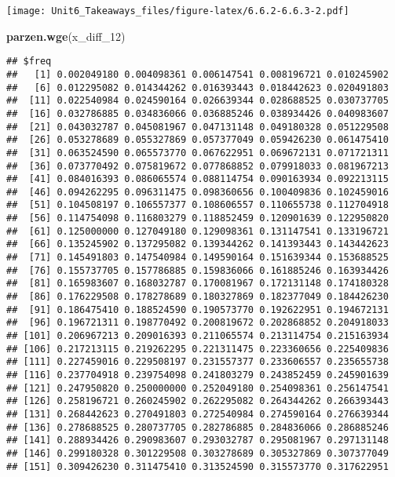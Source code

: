 \documentclass[]{article}
\newenvironment{Shaded}{\begin{snugshade}}{\end{snugshade}}
\newcommand{\DecValTok}[1]{\textcolor[rgb]{0.00,0.00,0.81}{#1}}
\newcommand{\KeywordTok}[1]{\textcolor[rgb]{0.13,0.29,0.53}{\textbf{#1}}}
\newcommand{\NormalTok}[1]{#1}
\begin{document}
\texttt{[image: Unit6\_Takeaways\_files/figure-latex/6.6.2-6.6.3-2.pdf]}

\begin{Shaded}
\begin{Highlighting}[]
\KeywordTok{parzen.wge}\NormalTok{(x_diff_}\DecValTok{12}\NormalTok{)}
\end{Highlighting}
\end{Shaded}

\begin{verbatim}
## $freq
##   [1] 0.002049180 0.004098361 0.006147541 0.008196721 0.010245902
##   [6] 0.012295082 0.014344262 0.016393443 0.018442623 0.020491803
##  [11] 0.022540984 0.024590164 0.026639344 0.028688525 0.030737705
##  [16] 0.032786885 0.034836066 0.036885246 0.038934426 0.040983607
##  [21] 0.043032787 0.045081967 0.047131148 0.049180328 0.051229508
##  [26] 0.053278689 0.055327869 0.057377049 0.059426230 0.061475410
##  [31] 0.063524590 0.065573770 0.067622951 0.069672131 0.071721311
##  [36] 0.073770492 0.075819672 0.077868852 0.079918033 0.081967213
##  [41] 0.084016393 0.086065574 0.088114754 0.090163934 0.092213115
##  [46] 0.094262295 0.096311475 0.098360656 0.100409836 0.102459016
##  [51] 0.104508197 0.106557377 0.108606557 0.110655738 0.112704918
##  [56] 0.114754098 0.116803279 0.118852459 0.120901639 0.122950820
##  [61] 0.125000000 0.127049180 0.129098361 0.131147541 0.133196721
##  [66] 0.135245902 0.137295082 0.139344262 0.141393443 0.143442623
##  [71] 0.145491803 0.147540984 0.149590164 0.151639344 0.153688525
##  [76] 0.155737705 0.157786885 0.159836066 0.161885246 0.163934426
##  [81] 0.165983607 0.168032787 0.170081967 0.172131148 0.174180328
##  [86] 0.176229508 0.178278689 0.180327869 0.182377049 0.184426230
##  [91] 0.186475410 0.188524590 0.190573770 0.192622951 0.194672131
##  [96] 0.196721311 0.198770492 0.200819672 0.202868852 0.204918033
## [101] 0.206967213 0.209016393 0.211065574 0.213114754 0.215163934
## [106] 0.217213115 0.219262295 0.221311475 0.223360656 0.225409836
## [111] 0.227459016 0.229508197 0.231557377 0.233606557 0.235655738
## [116] 0.237704918 0.239754098 0.241803279 0.243852459 0.245901639
## [121] 0.247950820 0.250000000 0.252049180 0.254098361 0.256147541
## [126] 0.258196721 0.260245902 0.262295082 0.264344262 0.266393443
## [131] 0.268442623 0.270491803 0.272540984 0.274590164 0.276639344
## [136] 0.278688525 0.280737705 0.282786885 0.284836066 0.286885246
## [141] 0.288934426 0.290983607 0.293032787 0.295081967 0.297131148
## [146] 0.299180328 0.301229508 0.303278689 0.305327869 0.307377049
## [151] 0.309426230 0.311475410 0.313524590 0.315573770 0.317622951

\end{verbatim}
\end{document}
